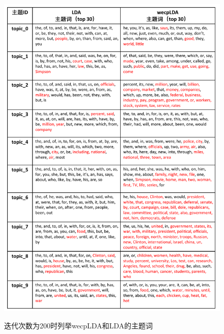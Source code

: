 \documentclass[master]{njuthesis}
\begin{document}
\begin{figure}[htbp]
  \centering
  \includegraphics[width= 1.0\textwidth]{figures//twords_iter200_chap5.pdf}\\
  \caption{迭代次数为200时列举wecpLDA和LDA的主题词}\label{fig:twords_iter200_chap5}
\end{figure}
\end{document}
